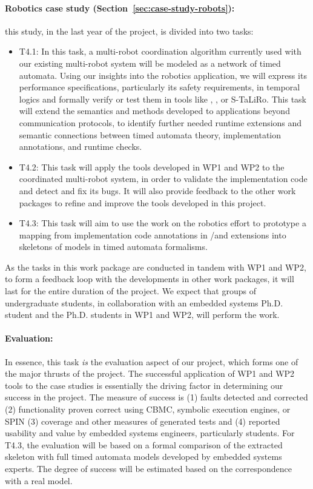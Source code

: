 \paragraph {Robotics case study (Section~\ref{sec:case-study-robots}):} this study, in the last year of the project, is divided into two tasks:
\noindent \begin{itemize}[labelsep=3pt,leftmargin=12pt]
  \item T4.1: In this task, a multi-robot coordination algorithm
    currently used with our existing multi-robot system will be
    modeled as a network of timed automata.  Using our insights into
    the robotics application, we will express its performance
    specifications, particularly its safety requirements, in temporal
    logics and formally verify or test them in tools like \uppaal,
    \prism, or S-TaLiRo.  This task will extend the semantics and
    methods developed to applications beyond communication protocols,
    to identify further needed runtime extensions and semantic
    connections between timed automata theory, implementation
    annotations, and runtime checks.
  \item T4.2: This task will apply the tools developed in WP1 and WP2
    to the coordinated multi-robot system, in order to validate the
    implementation code and detect and fix its bugs.  It will also
    provide feedback to the other work packages to refine and improve
    the tools developed in this project.
    \item T4.3: This task will aim to use the work on the robotics
      effort to prototype a mapping from implementation code
      annotations in \acsl/\eacsl and extensions into skeletons of
      models in timed automata formalisms.  
  \end{itemize}

As the tasks in this work package are conducted in tandem with WP1 and WP2, to form a feedback loop with the developments in other work packages, it will last for the entire duration of the project.
We expect that groups of undergraduate students, in collaboration with
an embedded systems Ph.D. student and the Ph.D. students in WP1 and WP2, will
perform the work.

\paragraph{Evaluation:} In essence, this task \emph{is} the evaluation
aspect of our project, which forms one of the major thrusts of
the project.  The successful application of WP1 and WP2 tools to the case studies is
essentially the driving factor in determining our success in the
project.
The measure of success is (1) faults detected and corrected (2) functionality
proven correct using CBMC, symbolic execution engines, or SPIN (3) coverage and other measures
of generated tests and (4) reported usability and value by embedded
systems engineers, particularly students.  For T4.3, the evaluation
will be based on a formal comparison of the extracted skeleton with
full timed automata models developed by embedded systems experts. The
degree of 
success will be estimated based on the correspondence with a real model.


